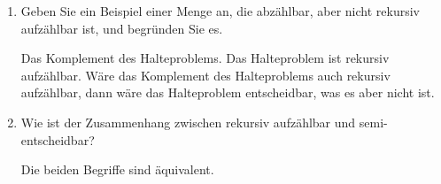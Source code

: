 \documentclass{lehramt-informatik-aufgabe}
\begin{document}
\begin{enumerate}
\begin{liAntwort}
\begin{itemize}
\end{itemize}
\footcite[Seite 258]{hoffmann}
\end{liAntwort}


\item Geben Sie ein Beispiel einer Menge an, die abzählbar, aber nicht
rekursiv aufzählbar ist, und begründen Sie es.

\begin{liAntwort}
Das Komplement des Halteproblems. Das Halteproblem ist rekursiv
aufzählbar. Wäre das Komplement des Halteproblems auch rekursiv
aufzählbar, dann wäre das Halteproblem entscheidbar, was es aber nicht
ist.
\end{liAntwort}


\item Wie ist der Zusammenhang zwischen rekursiv aufzählbar und
semi-entscheidbar?

\begin{liAntwort}
Die beiden Begriffe sind äquivalent.
\end{liAntwort}

\end{enumerate}
\end{document}
